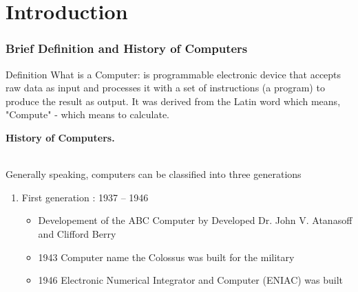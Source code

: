 \section{Introduction} 
\begin{frame}
\frametitle{Brief Definition and History of Computers}
\begin{exampleblock}{Definition}
	What is a Computer: is programmable electronic device that accepts raw data as input and processes it with a set of instructions (a program) to produce the result as output. It was derived from the Latin word which means, "Compute" - which means to calculate. 
\end{exampleblock}
\begin{large}
	\textbf{History of Computers.}
\end{large}
\\Generally speaking, computers can be classified into three generations
\begin{enumerate}
\item First generation : 1937 – 1946
		\begin{itemize}
			\item Developement of the ABC Computer by Developed Dr. John V. Atanasoff and Clifford Berry
			\item 1943 Computer name the Colossus was built for the military
			\item 1946 Electronic Numerical Integrator and Computer (ENIAC) was built
		\end{itemize}
\end{enumerate}
\end{frame}

